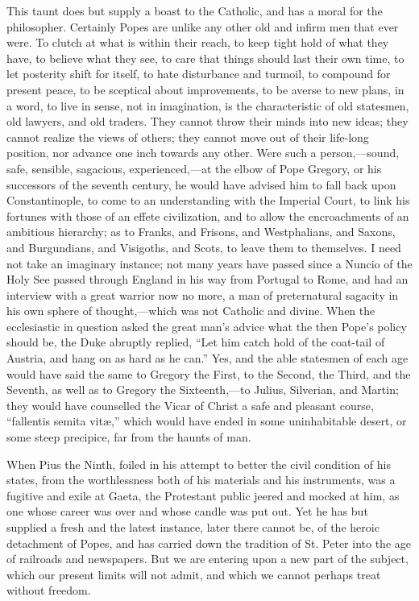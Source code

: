 This taunt does but supply a boast to the Catholic, and has a moral
for the philosopher. Certainly Popes are unlike any other old and
infirm men that ever were. To clutch at what is within their reach, to
keep tight hold of what they have, to believe what they see, to care
that things should last their own time, to let posterity shift for
itself, to hate disturbance and turmoil, to compound for present
peace, to be sceptical about improvements, to be averse to new plans,
in a word, to live in sense, not in imagination, is the characteristic
of old statesmen, old lawyers, and old traders. They cannot throw
their minds into new ideas; they cannot realize the views of others;
they cannot move out of their life-long position, nor advance one inch
towards any other. Were such a person,—sound, safe, sensible,
sagacious, experienced,—at the elbow of Pope Gregory, or his
successors of the seventh century, he would have advised him to fall
back upon Constantinople, to come to an understanding with the
Imperial Court, to link his fortunes with those of an effete
civilization, and to allow the encroachments of an ambitious
hierarchy; as to Franks, and Frisons, and Westphalians, and Saxons,
and Burgundians, and Visigoths, and Scots, to leave them to
themselves. I need not take an imaginary instance; not many years have
passed since a Nuncio of the Holy See passed through England in his
way from Portugal to Rome, and had an interview with a great warrior
now no more, a man of preternatural sagacity in his own sphere of
thought,—which was not Catholic and divine. When the ecclesiastic in
question asked the great man's advice what the then Pope's policy
should be, the Duke abruptly replied, ``Let him catch hold of the
coat-tail of Austria, and hang on as hard as he can.'' Yes, and
the able statesmen of each age would have said the same to Gregory the
First, to the Second, the Third, and the Seventh, as well as to
Gregory the Sixteenth,—to Julius, Silverian, and Martin; they would
have counselled the Vicar of Christ a safe and pleasant course, ``fallentis
semita vitæ,'' which would have ended in some uninhabitable
desert, or some steep precipice, far from the haunts of man.

When Pius the Ninth, foiled in his attempt to better the civil
condition of his states, from the worthlessness both of his materials
and his instruments, was a fugitive and exile at Gaeta, the Protestant
public jeered and mocked at him, as one whose career was over and
whose candle was put out. Yet he has but supplied a fresh and the
latest instance, later there cannot be, of the heroic detachment of
Popes, and has carried down the tradition of St. Peter into the age of
railroads and newspapers. But we are entering upon a new part of the
subject, which our present limits will not admit, and which we cannot
perhaps treat without freedom.

